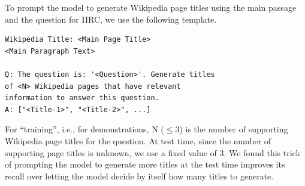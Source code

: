 To prompt the model to generate Wikipedia page titles using the main passage and the question for IIRC, we use the following template.

\begin{small}
\begin{verbatim}
Wikipedia Title: <Main Page Title>
<Main Paragraph Text>

Q: The question is: '<Question>'. Generate titles 
of <N> Wikipedia pages that have relevant
information to answer this question.
A: ["<Title-1>", "<Title-2>", ...]
\end{verbatim}
\end{small}

For ``training'', i.e., for demonstrations, N ($\le 3$) is the number of supporting Wikipedia page titles for the question. At test time, since the number of supporting page titles is unknown, we use a fixed value of 3. We found this trick of prompting the model to generate more titles at the test time improves its recall over letting the model decide by itself how many titles to generate.


